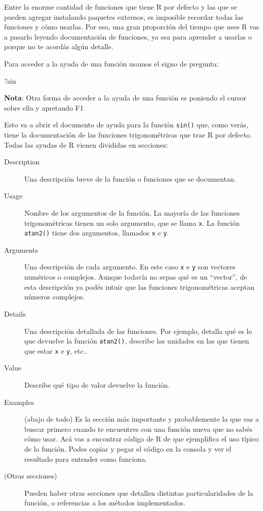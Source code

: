 \documentclass[
  openany]{book}
\newenvironment{Shaded}{\begin{snugshade}}{\end{snugshade}}
\newcommand{\NormalTok}[1]{#1}
\begin{document}
Entre la enorme cantidad de funciones que tiene R por defecto y las que se pueden agregar instalando paquetes externos, es imposible recordar todas las funciones y cómo usarlas.
Por eso, una gran proporción del tiempo que uses R vas a pasarlo leyendo documentación de funciones, ya sea para aprender a usarlas o porque no te acordás algún detalle.

Para acceder a la ayuda de una función usamos el signo de pregunta:

\begin{Shaded}
\begin{Highlighting}[]
\NormalTok{?sin}
\end{Highlighting}
\end{Shaded}

\textbf{Nota}: Otra forma de acceder a la ayuda de una función es poniendo el cursor sobre ella y apretando F1

Esto va a abrir el documento de ayuda para la función \texttt{sin()} que, como verás, tiene la documentación de las funciones trigonométricas que trae R por defecto.
Todas las ayudas de R vienen divididas en secciones:

\begin{description}
\item[Description]
Una descripción breve de la función o funciones que se documentan.
\item[Usage]
Nombre de los argumentos de la función.
La mayoría de las funciones trigonométricas tienen un solo argumento, que se llama \texttt{x}.
La función \texttt{atan2()} tiene dos argumentos, llamados \texttt{x} e \texttt{y}.
\item[Arguments]
Una descripción de cada argumento.
En este caso \texttt{x} e \texttt{y} son vectores numéricos o complejos.
Aunque todavía no sepas qué es un ``vector'', de esta descripción ya podés intuir que las funciones trigonométricas aceptan números complejos.
\item[Details]
Una descripción detallada de las funciones.
Por ejemplo, detalla qué es lo que devuelve la función \texttt{atan2()}, describe las unidades en las que tienen que estar \texttt{x} e \texttt{y}, etc..
\item[Value]
Describe qué tipo de valor devuelve la función.
\item[Examples]
(abajo de todo) Es la sección más importante y probablemente la que vas a buscar primero cuando te encuentres con una función nueva que no sabés cómo usar.
Acá vas a encontrar código de R de que ejemplifica el uso típico de la función.
Podes copiar y pegar el código en la consola y ver el resultado para entender como funciona.
\item[(Otras secciones)]
Pueden haber otras secciones que detallen distintas particularidades de la función, o referencias a los métodos implementados.
\end{description}
\end{document}
